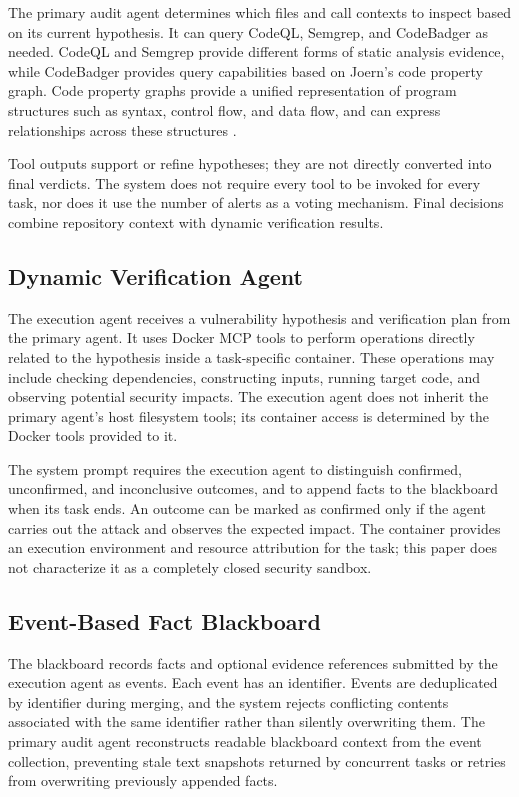 \documentclass[10pt,a4paper]{article}
\begin{document}
The primary audit agent determines which files and call contexts to inspect based on its current hypothesis. It can query CodeQL, Semgrep, and CodeBadger as needed. CodeQL and Semgrep provide different forms of static analysis evidence, while CodeBadger provides query capabilities based on Joern's code property graph. Code property graphs provide a unified representation of program structures such as syntax, control flow, and data flow, and can express relationships across these structures \cite{yamaguchi2014modeling}.

Tool outputs support or refine hypotheses; they are not directly converted into final verdicts. The system does not require every tool to be invoked for every task, nor does it use the number of alerts as a voting mechanism. Final decisions combine repository context with dynamic verification results.

\subsection{Dynamic Verification Agent}

The execution agent receives a vulnerability hypothesis and verification plan from the primary agent. It uses Docker MCP tools to perform operations directly related to the hypothesis inside a task-specific container. These operations may include checking dependencies, constructing inputs, running target code, and observing potential security impacts. The execution agent does not inherit the primary agent's host filesystem tools; its container access is determined by the Docker tools provided to it.

The system prompt requires the execution agent to distinguish confirmed, unconfirmed, and inconclusive outcomes, and to append facts to the blackboard when its task ends. An outcome can be marked as confirmed only if the agent carries out the attack and observes the expected impact. The container provides an execution environment and resource attribution for the task; this paper does not characterize it as a completely closed security sandbox.

\subsection{Event-Based Fact Blackboard}

The blackboard records facts and optional evidence references submitted by the execution agent as events. Each event has an identifier. Events are deduplicated by identifier during merging, and the system rejects conflicting contents associated with the same identifier rather than silently overwriting them. The primary audit agent reconstructs readable blackboard context from the event collection, preventing stale text snapshots returned by concurrent tasks or retries from overwriting previously appended facts.
\end{document}
